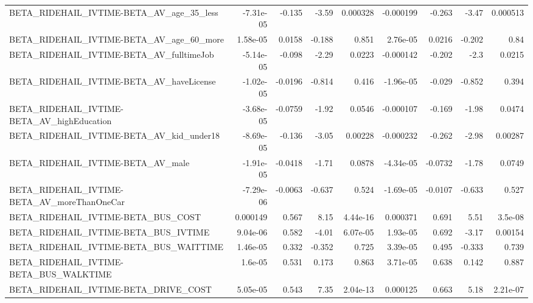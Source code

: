 \begin{tabular}{lrrrrrrrr}
BETA\_RIDEHAIL\_IVTIME-BETA\_AV\_age\_35\_less           &   -7.31e-05 &       -0.135 &    -3.59 & 0.000328 &  -0.000199 &      -0.263 &        -3.47 &      0.000513 \\
BETA\_RIDEHAIL\_IVTIME-BETA\_AV\_age\_60\_more           &    1.58e-05 &       0.0158 &   -0.188 &    0.851 &   2.76e-05 &      0.0216 &       -0.202 &          0.84 \\
BETA\_RIDEHAIL\_IVTIME-BETA\_AV\_fulltimeJob           &   -5.14e-05 &       -0.098 &    -2.29 &   0.0223 &  -0.000142 &      -0.202 &         -2.3 &        0.0215 \\
BETA\_RIDEHAIL\_IVTIME-BETA\_AV\_haveLicense           &   -1.02e-05 &      -0.0196 &   -0.814 &    0.416 &  -1.96e-05 &      -0.029 &       -0.852 &         0.394 \\
BETA\_RIDEHAIL\_IVTIME-BETA\_AV\_highEducation         &   -3.68e-05 &      -0.0759 &    -1.92 &   0.0546 &  -0.000107 &      -0.169 &        -1.98 &        0.0474 \\
BETA\_RIDEHAIL\_IVTIME-BETA\_AV\_kid\_under18           &   -8.69e-05 &       -0.136 &    -3.05 &  0.00228 &  -0.000232 &      -0.262 &        -2.98 &       0.00287 \\
BETA\_RIDEHAIL\_IVTIME-BETA\_AV\_male                  &   -1.91e-05 &      -0.0418 &    -1.71 &   0.0878 &  -4.34e-05 &     -0.0732 &        -1.78 &        0.0749 \\
BETA\_RIDEHAIL\_IVTIME-BETA\_AV\_moreThanOneCar        &   -7.29e-06 &      -0.0063 &   -0.637 &    0.524 &  -1.69e-05 &     -0.0107 &       -0.633 &         0.527 \\
BETA\_RIDEHAIL\_IVTIME-BETA\_BUS\_COST                 &    0.000149 &        0.567 &     8.15 & 4.44e-16 &   0.000371 &       0.691 &         5.51 &       3.5e-08 \\
BETA\_RIDEHAIL\_IVTIME-BETA\_BUS\_IVTIME               &    9.04e-06 &        0.582 &    -4.01 & 6.07e-05 &   1.93e-05 &       0.692 &        -3.17 &       0.00154 \\
BETA\_RIDEHAIL\_IVTIME-BETA\_BUS\_WAITTIME             &    1.46e-05 &        0.332 &   -0.352 &    0.725 &   3.39e-05 &       0.495 &       -0.333 &         0.739 \\
BETA\_RIDEHAIL\_IVTIME-BETA\_BUS\_WALKTIME             &     1.6e-05 &        0.531 &    0.173 &    0.863 &   3.71e-05 &       0.638 &        0.142 &         0.887 \\
BETA\_RIDEHAIL\_IVTIME-BETA\_DRIVE\_COST               &    5.05e-05 &        0.543 &     7.35 & 2.04e-13 &   0.000125 &       0.663 &         5.18 &      2.21e-07 \\

\end{tabular}
